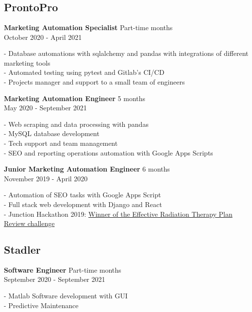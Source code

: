 \section*{\faBriefcase} \label{sec:experience}
 {}

\subsection{ProntoPro}
\textbf{Marketing Automation Specialist} \hfill Part-time  months \\ 
{\footnotesize October 2020 - April 2021} \\
{
    \raggedright
    - Database automations with sqlalchemy and pandas with
    integrations of different marketing tools \\
    - Automated testing using pytest and Gitlab's CI/CD \\
    - Projects manager and support to a small team of engineers \\
}

\textbf{Marketing Automation Engineer} \hfill 5 months \\ 
{\footnotesize May 2020 - September 2021} \\
{
    \raggedright
    - Web scraping and data processing with pandas \\
    - MySQL database development \\
    - Tech support and team management \\
    - SEO and reporting operations automation with Google Apps Scripts \\
}

\textbf{Junior Marketing Automation Engineer} \hfill 6 months \\ 
{\footnotesize November 2019 - April 2020} \\
{
    \raggedright
    - Automation of SEO tasks with Google Apps Script \\
    - Full stack web development with Django and React \\
    - Junction Hackathon 2019:
    \href{http://www.upv.es/noticias-upv/noticia-11673-makers-upv-tri-es.html}{Winner
    of the Effective Radiation Therapy Plan Review challenge}\\
}

\medskip
\subsection{Stadler}
\textbf{Software Engineer} \hfill Part-time  months \\ 
{\footnotesize September 2020 - September 2021} \\
{
    \raggedright
    - Matlab Software development with GUI \\
    - Predictive Maintenance \\
}